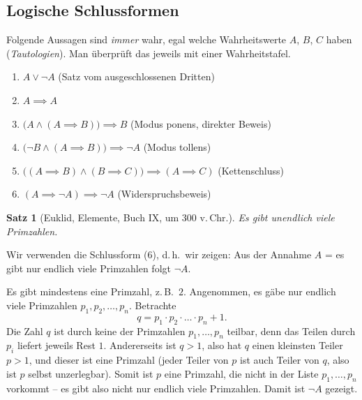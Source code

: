 \documentclass[a4paper]{article}
\makeatletter
\theoremstyle{kurzskript}
\newtheorem*{satzohne}{Satz}
\renewenvironment{proof}[1][\proofname]{\par\pushQED{\qed}%
  \normalfont\topsep\medskipamount\relax
  \trivlist\item[\hskip\labelsep\bfseries #1\@addpunct{.}]\ignorespaces}%
  {\popQED\endtrivlist\@endpefalse}
\renewcommand{\proofname}{Beweis}
\makeatother
\begin{document}
\subsection{Logische Schlussformen}

Folgende Aussagen sind \emph{immer} wahr, egal welche Wahrheitswerte $A$, $B$, $C$ haben (\emph{Tautologien}). Man überprüft das jeweils mit einer Wahrheitstafel.
\begin{enumerate}[label=(\arabic*)]
  \item $A \lor \neg A$ \hfill (Satz vom ausgeschlossenen Dritten)
  \item $A \implies A$
  \item $\bigl(A \land (A \implies B)\bigr) \implies B$ \hfill (Modus ponens, direkter Beweis)
  \item $\bigl(\neg B \land (A \implies B)\bigr) \implies \neg A$ \hfill (Modus tollens)
  \item $\bigl((A \implies B) \land (B \implies C)\bigr) \implies (A \implies C)$ \hfill (Kettenschluss)
  \item $(A \implies \neg A) \implies \neg A$ \hfill (Widerspruchsbeweis)
\end{enumerate}

\begin{satzohne}[Euklid, Elemente, Buch IX, um 300 v.\,Chr.]
Es gibt unendlich viele Primzahlen.
\end{satzohne}

\begin{proof}
Wir verwenden die Schlussform (6), d.\,h.\ wir zeigen: Aus der Annahme $A$ = \glqq es gibt nur endlich viele Primzahlen\grqq{} folgt $\neg A$.

Es gibt mindestens eine Primzahl, z.\,B.\ $2$. Angenommen, es gäbe nur endlich viele Primzahlen $p_1, p_2, \dots, p_n$. Betrachte
\[
  q = p_1 \cdot p_2 \cdot \ldots \cdot p_n + 1.
\]
Die Zahl $q$ ist durch keine der Primzahlen $p_1, \dots, p_n$ teilbar, denn das Teilen durch $p_i$ liefert jeweils Rest $1$. Andererseits ist $q > 1$, also hat $q$ einen kleinsten Teiler $p > 1$, und dieser ist eine Primzahl (jeder Teiler von $p$ ist auch Teiler von $q$, also ist $p$ selbst unzerlegbar). Somit ist $p$ eine Primzahl, die nicht in der Liste $p_1, \dots, p_n$ vorkommt -- es gibt also nicht nur endlich viele Primzahlen. Damit ist $\neg A$ gezeigt.
\end{proof}

\end{document}
